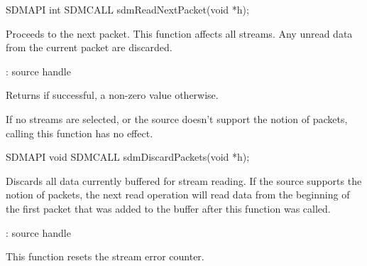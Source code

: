 \documentclass[a4paper,12pt,twoside,extrafontsizes]{memoir}
\begin{document}


\begin{cfuncprototype}
SDMAPI int SDMCALL sdmReadNextPacket(void *h);
\end{cfuncprototype}

\begin{funcdescr}
	Proceeds to the next packet. This function affects all streams. Any unread data from the current packet are discarded.
\end{funcdescr}

\begin{funcparams}
	: source handle
\end{funcparams}

\begin{funcret}
	Returns  if successful, a non-zero value otherwise.
\end{funcret}

\begin{funcremarks}
	If no streams are selected, or the source doesn't support the notion of packets, calling this function has no effect.
\end{funcremarks}



\begin{cfuncprototype}
SDMAPI void SDMCALL sdmDiscardPackets(void *h);
\end{cfuncprototype}

\begin{funcdescr}
	Discards all data currently buffered for stream reading. If the source supports the notion of packets, the next read operation will read data from the beginning of the first packet that was added to the buffer after this function was called.
\end{funcdescr}

\begin{funcparams}
	: source handle
\end{funcparams}

\begin{funcremarks}
	This function resets the stream error counter.
\end{funcremarks}

\end{document}
